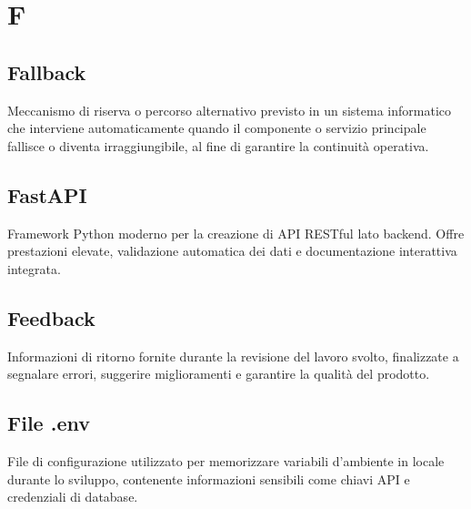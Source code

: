 \documentclass[a4paper, 11pt, oneside]{scrartcl} %
\begin{document}

\section*{F}


\subsection*{Fallback}


Meccanismo di riserva o percorso alternativo previsto in un sistema informatico che interviene automaticamente quando il componente o servizio principale fallisce o diventa irraggiungibile, al fine di garantire la continuità operativa.

\vspace{0.5cm}

\subsection*{FastAPI}


Framework Python moderno per la creazione di API RESTful lato backend. Offre prestazioni elevate, validazione automatica dei dati e documentazione interattiva integrata.

\vspace{0.5cm}

\subsection*{Feedback}


Informazioni di ritorno fornite durante la revisione del lavoro svolto, finalizzate a segnalare errori, suggerire miglioramenti e garantire la qualità del prodotto.

\vspace{0.5cm}

\subsection*{File .env}


File di configurazione utilizzato per memorizzare variabili d'ambiente in locale durante lo sviluppo, contenente informazioni sensibili come chiavi API e credenziali di database.
\end{document}
